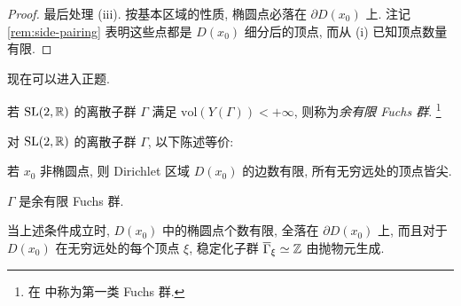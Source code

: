 \begin{proof}
	最后处理 (iii). 按基本区域的性质, 椭圆点必落在 $\partial D(x_0)$ 上. 注记 \ref{rem:side-pairing} 表明这些点都是 $D(x_0)$ 细分后的顶点, 而从 (i) 已知顶点数量有限.
\end{proof}

现在可以进入正题.

\begin{definition} 
	若 $\operatorname{SL}(2, \mathbb{R})$ 的离散子群 $\Gamma$ 满足 $\mathrm{vol}(Y(\Gamma)) < +\infty$, 则称为\emph{余有限 Fuchs 群}. \footnote{在 \cite{Mi89} 中称为第一类 Fuchs 群.}
\end{definition}

\begin{theorem}\label{prop:Fuchsian-1st-kind}
	对 $\operatorname{SL}(2,\mathbb{R})$ 的离散子群 $\Gamma$, 以下陈述等价:
	\begin{compactenum}[(i)]
		\item 若 $x_0$ 非椭圆点, 则 Dirichlet 区域 $D(x_0)$ 的边数有限, 所有无穷远处的顶点皆尖.
		\item $\Gamma$ 是余有限 Fuchs 群.
	\end{compactenum}
	当上述条件成立时, $D(x_0)$ 中的椭圆点个数有限, 全落在 $\partial D(x_0)$ 上, 而且对于 $D(x_0)$ 在无穷远处的每个顶点 $\xi$, 稳定化子群 $\overline{\Gamma}_\xi \simeq \mathbb{Z}$ 由抛物元生成.
\end{theorem}
